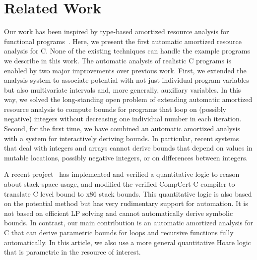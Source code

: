 \documentclass{sigplanconf}
\newcommand{\ifshort}[2]{\ifx\fullversion\undefined{#1}\else{#2}\fi}
\newcommand{\sectskip}[0]{\ifshort{\vspace{-3pt}}{}}
\newcommand{\aftersectskip}[0]{\ifshort{\vspace{-1pt}}{}}
\begin{document}
\sectskip
\section{Related Work}
\label{sec:related}
\aftersectskip

Our work has been inspired by type-based amortized resource analysis
for functional programs~\cite{Jost03,HoffmannH10,HoffmannAH12}.  Here,
we present the first automatic amortized resource analysis for
C. None of the existing techniques can handle the example programs we
describe in this work.
%
The automatic analysis of realistic C programs is enabled by two
major improvements over previous work.  First, we extended the
analysis system to associate potential with not just individual
program variables but also multivariate intervals
and, more generally, auxiliary variables.  In this way, we solved the
long-standing open problem of extending automatic amortized resource
analysis to compute bounds for programs that loop on (possibly
negative) integers without decreasing one individual number in each
iteration.  Second, for the first time, we have combined an automatic
amortized analysis with a system for interactively deriving bounds. In
particular, recent systems~\cite{HoffmannS13} that deal with integers
and arrays cannot derive bounds that depend on values in mutable
locations, possibly negative integers, or on differences between
integers.

A recent project~\cite{veristack14} has implemented and verified a
quantitative logic to reason about stack-space usage, and modified the
verified CompCert C compiler to translate C level bound to x86 stack
bounds.  This quantitative logic is also based on the potential method
but has very rudimentary support for automation. It is not based on
efficient LP solving and cannot automatically derive symbolic
bounds.  In contrast, our main contribution is an automatic amortized
analysis for C that can derive parametric bounds for loops and
recursive functions fully automatically.
%
In this article, we also use a more general quantitative Hoare
logic that is parametric in the resource of interest.
\end{document}
